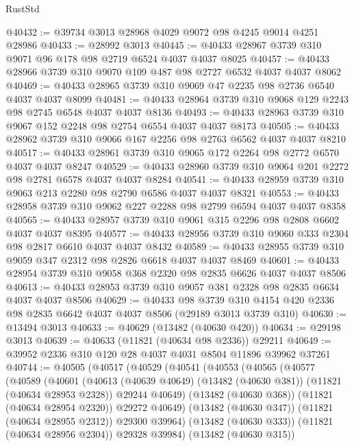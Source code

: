 \begin{lexlean}{RustStd}
\begin{coremodule}
@40432 := @39734 @3013 @28968 @4029 @9072 @98 @4245 @9014 @4251 @28986
@40433 := @28992 @3013
@40445 := @40433 @28967 @3739 @310 @9071 @96 @178 @98 @2719 @6524 @4037 @4037 @8025
@40457 := @40433 @28966 @3739 @310 @9070 @109 @487 @98 @2727 @6532 @4037 @4037 @8062
@40469 := @40433 @28965 @3739 @310 @9069 @47 @2235 @98 @2736 @6540 @4037 @4037 @8099
@40481 := @40433 @28964 @3739 @310 @9068 @129 @2243 @98 @2745 @6548 @4037 @4037 @8136
@40493 := @40433 @28963 @3739 @310 @9067 @152 @2248 @98 @2754 @6554 @4037 @4037 @8173
@40505 := @40433 @28962 @3739 @310 @9066 @167 @2256 @98 @2763 @6562 @4037 @4037 @8210
@40517 := @40433 @28961 @3739 @310 @9065 @172 @2264 @98 @2772 @6570 @4037 @4037 @8247
@40529 := @40433 @28960 @3739 @310 @9064 @201 @2272 @98 @2781 @6578 @4037 @4037 @8284
@40541 := @40433 @28959 @3739 @310 @9063 @213 @2280 @98 @2790 @6586 @4037 @4037 @8321
@40553 := @40433 @28958 @3739 @310 @9062 @227 @2288 @98 @2799 @6594 @4037 @4037 @8358
@40565 := @40433 @28957 @3739 @310 @9061 @315 @2296 @98 @2808 @6602 @4037 @4037 @8395
@40577 := @40433 @28956 @3739 @310 @9060 @333 @2304 @98 @2817 @6610 @4037 @4037 @8432
@40589 := @40433 @28955 @3739 @310 @9059 @347 @2312 @98 @2826 @6618 @4037 @4037 @8469
@40601 := @40433 @28954 @3739 @310 @9058 @368 @2320 @98 @2835 @6626 @4037 @4037 @8506
@40613 := @40433 @28953 @3739 @310 @9057 @381 @2328 @98 @2835 @6634 @4037 @4037 @8506
@40629 := @40433
    @98
    @3739
    @310
    @4154
    @420
    @2336
    @98
    @2835
    @6642
    @4037
    @4037
    @8506
    (@29189 @3013 @3739 @310)
@40630 := @13494 @3013
@40633 := @40629 (@13482 (@40630 @420))
@40634 := @29198 @3013
@40639 := @40633 (@11821 (@40634 @98 @2336)) @29211
@40649 := @39952 @2336 @310 @120 @28 @4037 @4031 @8504 @11896 @39962 @37261
@40744 := @40505
    (@40517
      (@40529
        (@40541
          (@40553
            (@40565
              (@40577
                (@40589
                  (@40601
                    (@40613
                      (@40639 @40649)
                      (@13482 (@40630 @381))
                      (@11821 (@40634 @28953 @2328))
                      @29244
                      @40649)
                    (@13482 (@40630 @368))
                    (@11821 (@40634 @28954 @2320))
                    @29272
                    @40649)
                  (@13482 (@40630 @347))
                  (@11821 (@40634 @28955 @2312))
                  @29300
                  @39964)
                (@13482 (@40630 @333))
                (@11821 (@40634 @28956 @2304))
                @29328
                @39984)
              (@13482 (@40630 @315))

\end{coremodule}
\end{lexlean}
